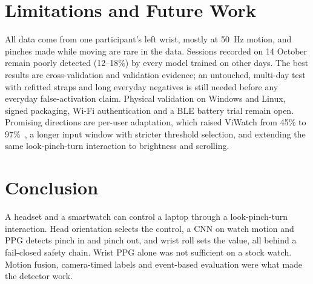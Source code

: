 \section{Limitations and Future Work}

All data come from one participant's left wrist, mostly at 50~Hz motion, and pinches made while moving are rare in the data. Sessions recorded on 14 October remain poorly detected (12--18\%) by every model trained on other days. The best results are cross-validation and validation evidence; an untouched, multi-day test with refitted straps and long everyday negatives is still needed before any everyday false-activation claim. Physical validation on Windows and Linux, signed packaging, Wi-Fi authentication and a BLE battery trial remain open. Promising directions are per-user adaptation, which raised ViWatch from 45\% to 97\%~\cite{viwatch2023}, a longer input window with stricter threshold selection, and extending the same look-pinch-turn interaction to brightness and scrolling.

\section{Conclusion}

A headset and a smartwatch can control a laptop through a look-pinch-turn interaction. Head orientation selects the control, a CNN on watch motion and PPG detects pinch in and pinch out, and wrist roll sets the value, all behind a fail-closed safety chain. Wrist PPG alone was not sufficient on a stock watch. Motion fusion, camera-timed labels and event-based evaluation were what made the detector work.
